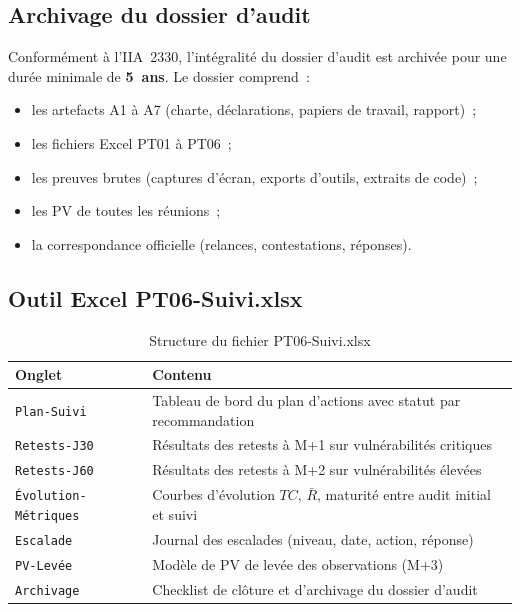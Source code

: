 \documentclass[12pt,a4paper,oneside]{report}
\begin{document}
\subsection{Archivage du dossier d'audit}

Conform\'ement \`a l'IIA~2330, l'int\'egralit\'e du dossier d'audit est
archiv\'ee pour une dur\'ee minimale de \textbf{5~ans}. Le dossier comprend~:

\begin{itemize}[label={\color{gold}}, leftmargin=*, itemsep=2pt]
	\item les artefacts A1 \`a A7 (charte, d\'eclarations, papiers de travail,
	rapport)~;
	\item les fichiers Excel PT01 \`a PT06~;
	\item les preuves brutes (captures d'\'ecran, exports d'outils, extraits
	de code)~;
	\item les PV de toutes les r\'eunions~;
	\item la correspondance officielle (relances, contestations, r\'eponses).
\end{itemize}

\subsection{Outil Excel PT06-Suivi.xlsx}

\begin{table}[H]
	\centering\small
	\caption{Structure du fichier PT06-Suivi.xlsx}
	\label{tab:pt06}
	\begin{tabularx}{\textwidth}{p{4cm}X}
		\toprule
		\rowcolor{theadcolor}
		\color{white}\textbf{Onglet} &
		\color{white}\textbf{Contenu} \\
		\midrule
		\texttt{Plan-Suivi} & Tableau de bord du plan d'actions avec statut par recommandation \\
		\texttt{Retests-J30} & Résultats des retests à M+1 sur vulnérabilités critiques \\
		\texttt{Retests-J60} & Résultats des retests à M+2 sur vulnérabilités élevées \\
		\texttt{Évolution-Métriques} & Courbes d'évolution $TC$, $\bar{R}$, maturité entre audit initial et suivi \\
		\texttt{Escalade} & Journal des escalades (niveau, date, action, réponse) \\
		\texttt{PV-Levée} & Modèle de PV de levée des observations (M+3) \\
		\texttt{Archivage} & Checklist de clôture et d'archivage du dossier d'audit \\
		\bottomrule
	\end{tabularx}
\end{table}
\end{document}
